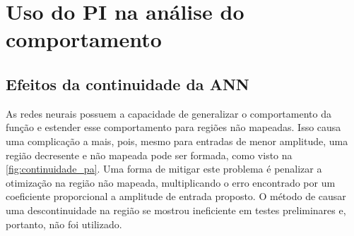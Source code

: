 
\section{Uso do PI na análise do comportamento} \label{sec:estudoi-pi}

\subsection{Efeitos da continuidade da ANN} \label{subsec:estudoi-pi-conti}
As redes neurais possuem a capacidade de generalizar o comportamento da função e estender esse comportamento para regiões não mapeadas. Isso causa uma complicação a mais, pois, mesmo para entradas de menor amplitude, uma região decresente e não mapeada pode ser formada, como visto na \autoref{fig:continuidade_pa}. Uma forma de mitigar este problema é penalizar a otimização na região não mapeada, multiplicando o erro encontrado por um coeficiente proporcional a amplitude de entrada proposto. O método de causar uma descontinuidade na região se mostrou ineficiente em testes preliminares e, portanto, não foi utilizado.

